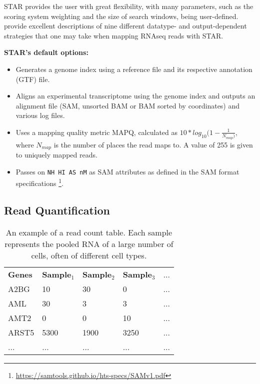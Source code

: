 \ac{STAR} provides the user with great flexibility, with many parameters, such as  the scoring system weighting and the size of search windows, being user-defined. \cite{dobin2015mapping} provide excellent descriptions of nine different datatype- and output-dependent strategies that one may take when mapping RNAseq reads with STAR. 



\textbf{STAR's default options:}
\begin{itemize}\itemsep0em
\item Generates a genome index using a reference file and its respective annotation (GTF) file.
\item Aligns an experimental transcriptome using the genome index and outputs an alignment file (SAM, unsorted BAM or BAM sorted by coordinates) and various log files.
\item Uses a mapping quality metric MAPQ, calculated as $10*log_{10}(1-\frac{1}{N_{map})}$, where ${N_{map}}$ is the number of places the read maps to. A value of 255 is given to uniquely mapped reads.
\item Passes on \texttt{NH HI AS nM} as SAM attributes as defined in the SAM format specifications \footnote{\url{https://samtools.github.io/hts-specs/SAMv1.pdf}}.
\end{itemize}




\subsection{Read Quantification}

\begin{table}[h]
\centering
\caption{An example of a read count table. Each sample represents the pooled RNA of a large number of cells, often of different cell types.}
\label{tab:read_count}
\begin{tabular}{lllll}
\textbf{Genes} & \textbf{Sample$_{1}$} & \textbf{Sample$_{2}$} & \textbf{Sample$_{3}$} & ...  \\
A2BG  & 10      & 30      & 0       & ...  \\
AML   & 30      & 3       & 3       & ...  \\
AMT2  & 0       & 0       & 10      & ...  \\
ARST5 & 5300    & 1900    & 3250    & ...  \\
...   & ...     & ...     & ...     & ... 
\end{tabular}
\end{table}


